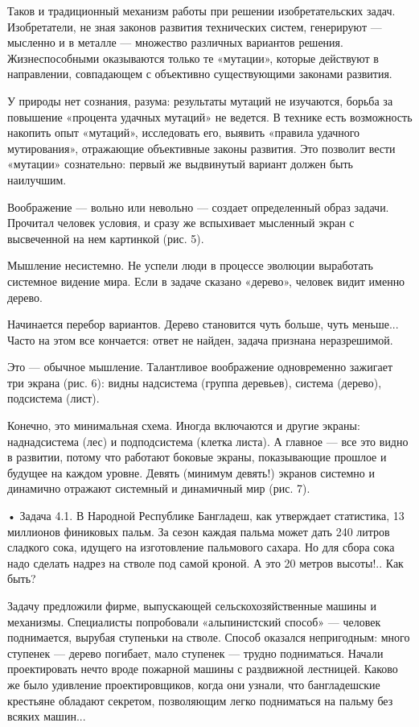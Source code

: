Таков  и традиционный  механизм  работы  при решении  изобретательских
задач.  Изобретатели, не  зная  законов  развития технических  систем,
генерируют  — мысленно  и в  металле —  множество различных  вариантов
решения.  Жизнеспособными  оказываются  только те  «мутации»,  которые
действуют  в  направлении,   совпадающем  с  объективно  существующими
законами развития.

У  природы  нет сознания,  разума:  результаты  мутаций не  изучаются,
борьба  за   повышение  «процента  удачных  мутаций»   не  ведется.  В
технике  есть возможность  накопить опыт  «мутаций», исследовать  его,
выявить «правила удачного  мутирования», отражающие объективные законы
развития.  Это   позволит  вести  «мутации»  сознательно:   первый  же
выдвинутый вариант должен быть наилучшим.

Воображение — вольно или невольно — создает определенный образ задачи.
Прочитал  человек условия,  и сразу  же вспыхивает  мысленный экран  с
высвеченной на нем картинкой (рис. 5).


Мышление  несистемно. Не  успели люди  в процессе  эволюции выработать
системное видение мира. Если в  задаче сказано «дерево», человек видит
именно дерево.

Начинается  перебор вариантов.  Дерево  становится  чуть больше,  чуть
меньше...  Часто  на  этом  все кончается:  ответ  не  найден,  задача
признана неразрешимой.

Это — обычное мышление.  Талантливое воображение одновременно зажигает
три  экрана  (рис. 6):  видны  надсистема  (группа деревьев),  система
(дерево), подсистема (лист).


Конечно,  это минимальная  схема. Иногда  включаются и  другие экраны:
наднадсистема (лес)  и подподсистема (клетка  листа). А главное  — все
это видно в развитии, потому что работают боковые экраны, показывающие
прошлое и будущее  на каждом уровне. Девять  (минимум девять!) экранов
системно и динамично отражают системный и динамичный мир (рис. 7).

•  Задача  4.1.  В   Народной  Республике  Бангладеш,  как  утверждает
статистика, 13 миллионов финиковых пальм. За сезон каждая пальма может
дать  240 литров  сладкого  сока, идущего  на изготовление  пальмового
сахара. Но  для сбора  сока надо  сделать надрез  на стволе  под самой
кроной. А это 20 метров высоты!.. Как быть?

Задачу  предложили фирме,  выпускающей  сельскохозяйственные машины  и
механизмы.  Специалисты попробовали  «альпинистский способ»  — человек
поднимается, вырубая ступеньки на стволе. Способ оказался непригодным:
много ступенек — дерево погибает,  мало ступенек — трудно подниматься.
Начали  проектировать   нечто  вроде  пожарной  машины   с  раздвижной
лестницей. Каково же было удивление проектировщиков, когда они узнали,
что  бангладешские  крестьяне  обладают  секретом,  позволяющим  легко
подниматься на пальму без всяких машин...

